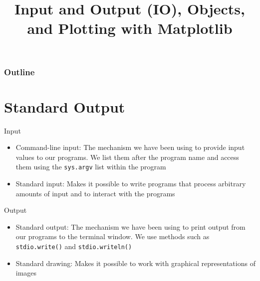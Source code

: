 \documentclass[8pt,a4paper,compress]{beamer}
\title{Input and Output (IO), Objects, and Plotting with Matplotlib}
\date{}
\begin{document}
\begin{frame}
\vfill
\titlepage
\end{frame}

\begin{frame}
\frametitle{Outline}
\tableofcontents
\end{frame}

\section{Standard Output}
\begin{frame}[fragile]
\begin{center}
\end{center}

\bigskip

Input
\begin{itemize}
\item Command-line input: The mechanism we have been using to provide
input values to our programs. We list them after the program name and access them using the \lstinline{sys.argv} list within the program
\item Standard input: Makes it possible to write programs that
process arbitrary amounts of input and to interact with the programs
\end{itemize}

\bigskip

Output
\begin{itemize}
\item Standard output: The mechanism we have been using to print output from our programs to the terminal window. We use methods such as \lstinline{stdio.write()} and \lstinline{stdio.writeln()}
\item Standard drawing: Makes it possible to work with graphical representations of images
\end{itemize}
\end{frame}
\end{document}
